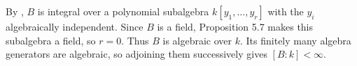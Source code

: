By , $B$ is integral over a polynomial subalgebra $k[y_1,\ldots,y_r]$ with the $y_i$ algebraically independent. Since $B$ is a field, Proposition 5.7 makes this subalgebra a field, so $r=0$. Thus $B$ is algebraic over $k$. Its finitely many algebra generators are algebraic, so adjoining them successively gives $[B:k]<\infty$.
